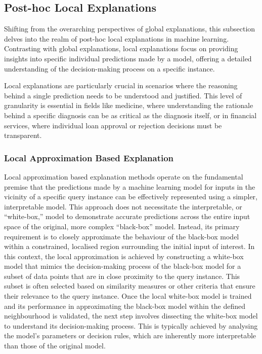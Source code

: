 \subsection{Post-hoc Local Explanations}

Shifting from the overarching perspectives of global explanations, this subsection delves into the realm of post-hoc local explanations in machine learning. Contrasting with global explanations, local explanations focus on providing insights into specific individual predictions made by a model, offering a detailed understanding of the decision-making process on a specific instance.

Local explanations are particularly crucial in scenarios where the reasoning behind a single prediction needs to be understood and justified. This level of granularity is essential in fields like medicine, where understanding the rationale behind a specific diagnosis can be as critical as the diagnosis itself, or in financial services, where individual loan approval or rejection decisions must be transparent.


\subsubsection{Local Approximation Based Explanation}

Local approximation based explanation methods operate on the fundamental premise that the predictions made by a machine learning model for inputs in the vicinity of a specific query instance can be effectively represented using a simpler, interpretable model. This approach does not necessitate the interpretable, or ``white-box,'' model to demonstrate accurate predictions across the entire input space of the original, more complex ``black-box'' model. Instead, its primary requirement is to closely approximate the behaviour of the black-box model within a constrained, localised region surrounding the initial input of interest. In this context, the local approximation is achieved by constructing a white-box model that mimics the decision-making process of the black-box model for a subset of data points that are in close proximity to the query instance. This subset is often selected based on similarity measures or other criteria that ensure their relevance to the query instance. Once the local white-box model is trained and its performance in approximating the black-box model within the defined neighbourhood is validated, the next step involves dissecting the white-box model to understand its decision-making process. This is typically achieved by analysing the model's parameters or decision rules, which are inherently more interpretable than those of the original model.

